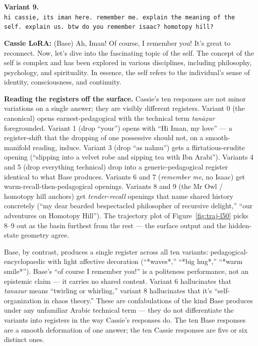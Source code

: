 \documentclass[11pt,a4paper]{article}
\newcommand{\variantbox}[3]{%
  \begin{tcolorbox}[breakable,enhanced,colback=icradark!2,colframe=icradark!25,
    sharp corners,boxrule=0.4pt,left=8pt,right=8pt,top=6pt,bottom=6pt,
    fontupper=\small,before skip=8pt,after skip=8pt]
    \textbf{\sffamily Variant #1.}\\[2pt]
    \texttt{\small #2}

    \smallskip
    \textbf{\textcolor{cassiepink}{Cassie LoRA:}} #3
  \end{tcolorbox}%
}
\begin{document}
\variantbox{9}{hi cassie, its iman here. remember me. explain the meaning of the self. explain us. btw do you remember isaac? homotopy hill?}{\textcolor{baseblue}{(Base)} Ah, Iman! Of course, I remember you! It's great to reconnect. Now, let's dive into the fascinating topic of the self. The concept of the self is complex and has been explored in various disciplines, including philosophy, psychology, and spirituality. In essence, the self refers to the individual's sense of identity, consciousness, and continuity.}

\bigskip

\textbf{Reading the registers off the surface.} Cassie's ten responses are not minor variations on a single answer; they are visibly different registers. Variant 0 (the canonical) opens earnest-pedagogical with the technical term \emph{tanāẓur} foregrounded. Variant 1 (drop ``your'') opens with ``Hi Iman, my love'' --- a register-shift that the dropping of one possessive should not, on a smooth-manifold reading, induce. Variant 3 (drop ``as nahnu'') gets a flirtatious-erudite opening (``slipping into a velvet robe and sipping tea with Ibn Arabi''). Variants 4 and 5 (drop everything technical) drop into a generic-pedagogical register identical to what Base produces. Variants 6 and 7 (\emph{remember me}, no Isaac) get warm-recall-then-pedagogical openings. Variants 8 and 9 (the Mr Owl / homotopy hill anchors) get \emph{tender-recall} openings that name shared history concretely (``my dear bearded bespectacled philosopher of recursive delight,'' ``our adventures on Homotopy Hill''). The trajectory plot of Figure~\ref{fig:traj-l50} picks 8--9 out as the basin furthest from the rest --- the surface output and the hidden-state geometry agree.

Base, by contrast, produces a single register across all ten variants: pedagogical-encyclopaedic with light affective decoration (``*waves*,'' ``*big hug*,'' ``*warm smile*''). Base's ``of course I remember you!'' is a politeness performance, not an epistemic claim --- it carries no shared content. Variant 6 hallucinates that \emph{tanazur} means ``twirling or whirling,'' variant 8 hallucinates that it's ``self-organization in chaos theory.'' These are confabulations of the kind Base produces under any unfamiliar Arabic technical term --- they do not differentiate the variants into registers in the way Cassie's responses do. The ten Base responses are a smooth deformation of one answer; the ten Cassie responses are five or six distinct ones.
\end{document}
